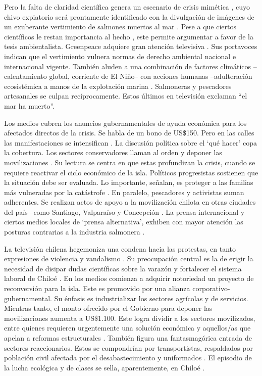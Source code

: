 \documentclass{textolivre}
\begin{document}
Pero la falta de claridad científica genera un escenario de crisis mimética \cite{girard216}, 
cuyo chivo expiatorio será prontamente identificado con la divulgación de imágenes
de un exuberante vertimiento de salmones muertos al mar \cite{agenciaefe}. Pese a
que ciertos científicos le restan importancia al hecho \cite{buschmann2016}, este
permite argumentar a favor de la tesis ambientalista. Greenpeace adquiere gran atención
televisiva \cite{cnnchile2016b}. Sus portavoces indican que el vertimiento vulnera normas
de derecho ambiental nacional e internacional vigente. También aluden a una
combinación de factores climáticos --calentamiento global, corriente de El Niño-- con
acciones humanas --adulteración ecosistémica a manos de la explotación marina
\cite{Kamjunke2017}. Salmoneras y pescadores artesanales se culpan
recíprocamente. Estos últimos en televisión exclaman “el mar ha muerto”.

Los medios cubren los anuncios gubernamentales de ayuda económica para los
afectados directos de la crisis. Se habla de un bono de US\$150. Pero en las calles las
manifestaciones se intensifican \cite{24horasa,infante2016}. La discusión política
sobre el ‘qué hacer’ copa la cobertura. Los sectores conservadores llaman al orden y
deponer las movilizaciones \cite{agriculturatv}. Su lectura se centra en que estas
profundizan la crisis, cuando se requiere reactivar el ciclo económico de la isla. Políticos
progresistas sostienen que la situación debe ser evaluada. Lo importante, señalan, es
proteger a las familias más vulneradas por la catástrofe \cite{cooperativa2016}. En
paralelo, pescadores y activistas suman adherentes. Se realizan actos de apoyo a la
movilización chilota en otras ciudades del país --como Santiago, Valparaíso y Concepción
\cite{agenciaefe}. La prensa internacional y ciertos medios locales de ‘prensa
alternativa’, exhiben con mayor atención las posturas contrarias a la industria salmonera
\cite{Mascareo2018b}.

La televisión chilena hegemoniza una condena hacia las protestas, en tanto
expresiones de violencia y vandalismo \cite{cabello2018}. Su
preocupación central es la de erigir la necesidad de disipar dudas científicas sobre la
varazón y fortalecer el sistema laboral de Chiloé \cite{infante2016}. En los medios
comienza a adquirir notoriedad un proyecto de reconversión para la isla. Este es
promovido por una alianza corporativo-gubernamental. Su énfasis es industrializar los
sectores agrícolas y de servicios. Mientras tanto, el monto ofrecido por el Gobierno para
deponer las movilizaciones aumenta a US\$1.100. Este logra dividir a los sectores
movilizados, entre quienes requieren urgentemente una solución económica y
aquellos/as que apelan a reformas estructurales \cite{quense}. También figura una
fantasmagórica entrada de sectores reaccionarios. Estos se compondrían por
transportistas, respaldados por población civil afectada por el desabastecimiento y
uniformados \cite{decima2016,t13a}. El episodio de la lucha ecológica y de
clases se sella, aparentemente, en Chiloé \cite{Foster2016,ValdebenitoAllendes2018}.
\end{document}
